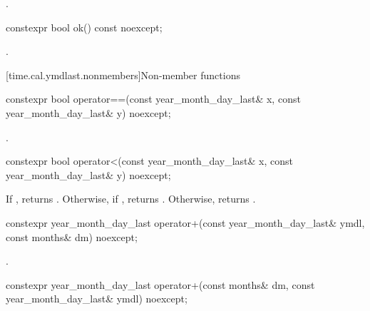 \begin{itemdescr}
\pnum
\returns {}.
\end{itemdescr}

%
\begin{itemdecl}
constexpr bool ok() const noexcept;
\end{itemdecl}

\begin{itemdescr}
\pnum
\returns {}.
\end{itemdescr}

[time.cal.ymdlast.nonmembers]{Non-member functions}

%
\begin{itemdecl}
constexpr bool operator==(const year_month_day_last& x, const year_month_day_last& y) noexcept;
\end{itemdecl}

\begin{itemdescr}
\pnum
\returns {}.
\end{itemdescr}

%
\begin{itemdecl}
constexpr bool operator<(const year_month_day_last& x, const year_month_day_last& y) noexcept;
\end{itemdecl}

\begin{itemdescr}
\pnum
\returns
If , returns .
Otherwise, if , returns .
Otherwise, returns .
\end{itemdescr}

%
\begin{itemdecl}
constexpr year_month_day_last
  operator+(const year_month_day_last& ymdl, const months& dm) noexcept;
\end{itemdecl}

\begin{itemdescr}
\pnum
\returns {}.
\end{itemdescr}

%
\begin{itemdecl}
constexpr year_month_day_last
  operator+(const months& dm, const year_month_day_last& ymdl) noexcept;
\end{itemdecl}

